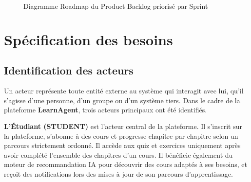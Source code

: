 \documentclass[12pt,a4paper]{report}
\begin{document}
\begin{figure}[H]
{
}%
\vspace{0.5cm}
\caption{Diagramme Roadmap du Product Backlog priorisé par Sprint}
\label{fig:backlog}
\end{figure}

\section{Spécification des besoins}

\subsection{Identification des acteurs}

Un acteur représente toute entité externe au système qui interagit avec lui, qu'il s'agisse d'une personne, d'un groupe ou d'un système tiers. Dans le cadre de la plateforme \textbf{LearnAgent}, trois acteurs principaux ont été identifiés.

\textbf{L'Étudiant (STUDENT)} est l'acteur central de la plateforme. Il s'inscrit sur la plateforme, s'abonne à des cours et progresse chapitre par chapitre selon un parcours strictement ordonné. Il accède aux quiz et exercices uniquement après avoir complété l'ensemble des chapitres d'un cours. Il bénéficie également du moteur de recommandation IA pour découvrir des cours adaptés à ses besoins, et reçoit des notifications lors des mises à jour de son parcours d'apprentissage.
\end{document}
